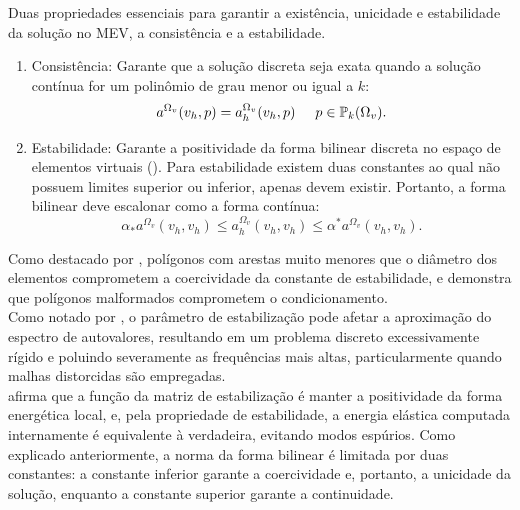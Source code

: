     \indent Duas propriedades essenciais para garantir a existência, unicidade e estabilidade da solução no MEV, a consistência e a estabilidade.
    \begin{enumerate}
        \item Consistência: Garante que a solução discreta seja exata quando a solução contínua for um polinômio de grau menor ou igual a $k$: 
        \begin{equation}
            a^{\Omega_v}(v_h,p) = a_h^{\Omega_v}(v_h,p) \hspace{5mm}p \in \mathbb{P}_k({\Omega_v}).
            \label{eq:4.52}
        \end{equation}
        \item Estabilidade: Garante a positividade da forma bilinear discreta no espaço de elementos virtuais (\citet{arbitraryorder2dvirtualelementspolygonalmeshespartelasticproblem2017a}). Para estabilidade existem duas constantes ao qual não possuem limites superior ou inferior, apenas devem existir. Portanto, a forma bilinear deve escalonar como a forma contínua: 
        \begin{equation}
            \alpha_* a^{\Omega_v}\left( v_h , v_h \right) \leq a_h^{\Omega_v}\left( v_h , v_h \right) \leq \alpha^* a^{\Omega_v}\left( v_h , v_h \right).
            \label{eq:4.53}
        \end{equation}
    \end{enumerate}
    \indent Como destacado por \citet{stabilityanalysisvirtualelementmethod2016a}, polígonos com arestas muito menores que o diâmetro dos elementos comprometem a coercividade da constante de estabilidade, e \citet{illconditioningvirtualelementmethodstabilizationsbases2018} demonstra que polígonos malformados comprometem o condicionamento. \\
    \indent Como notado por \citet{virtualelementmethodstekloveigenvalueproblemallowingsmalledges2020a}, o parâmetro de estabilização pode afetar a aproximação do espectro de autovalores, resultando em um problema discreto excessivamente rígido e poluindo severamente as frequências mais altas, particularmente quando malhas distorcidas são empregadas. \\
    \citet{arbitraryorder2dvirtualelementspolygonalmeshespartelasticproblem2017a} afirma que a função da matriz de estabilização é manter a positividade da forma energética local, e, pela propriedade de estabilidade, a energia elástica computada internamente é equivalente à verdadeira, evitando modos espúrios. Como explicado anteriormente, a norma da forma bilinear é limitada por duas constantes: a constante inferior garante a coercividade e, portanto, a unicidade da solução, enquanto a constante superior garante a continuidade.\\
